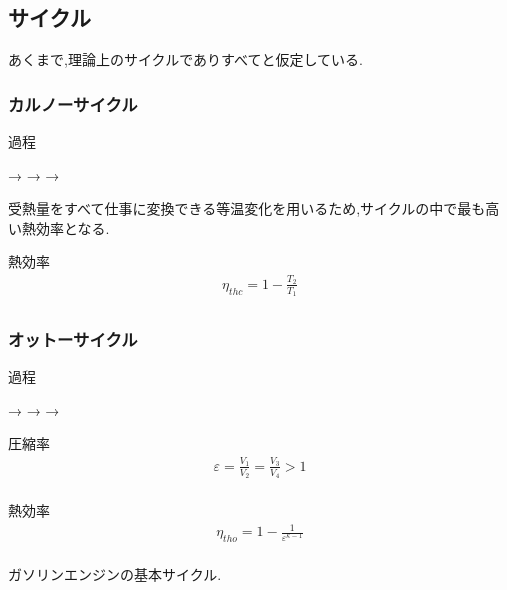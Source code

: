 \documentclass[a4paper]{jsarticle}
\begin{document}
\subsection{サイクル}
あくまで,理論上のサイクルでありすべてと仮定している.
\subsubsection{カルノーサイクル}
\begin{itembox}[l]{過程}
    \begin{center}
        \quad → \quad {} \quad → \quad {} \quad → \quad {}
    \end{center}
\end{itembox}
受熱量をすべて仕事に変換できる等温変化を用いるため,サイクルの中で最も高い熱効率となる.
\begin{itembox}[l]{熱効率}
    \begin{eqnarray*}
        \eta_{thc}=1-\frac{T_2}{T_1}\\
    \end{eqnarray*}
\end{itembox}
\subsubsection{オットーサイクル}
\begin{itembox}[l]{過程}
    \begin{center}
        \quad → \quad {} \quad → \quad {} \quad → \quad {}
    \end{center}
\end{itembox}
\begin{itembox}[l]{圧縮率}
    \begin{eqnarray*}
        \varepsilon=\frac{V_1}{V_2}=\frac{V_3}{V_4}> 1\\
    \end{eqnarray*}
\end{itembox}
\begin{itembox}[l]{熱効率}
    \begin{eqnarray*}
        \eta_{tho}=1-\frac{1}{\varepsilon^{\kappa-1}}\\
    \end{eqnarray*}
\end{itembox}
ガソリンエンジンの基本サイクル.
\end{document}
